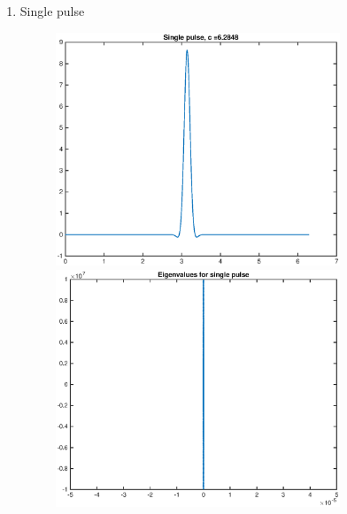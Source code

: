 \documentclass[12pt]{article}
\begin{document}
\begin{enumerate}
	\item Single pulse
	\begin{figure}[H]
	\includegraphics[width=8.5cm]{2single.eps}
	\includegraphics[width=8.5cm]{2singleeig.eps}
	\end{figure}


\end{enumerate}
\end{document}
